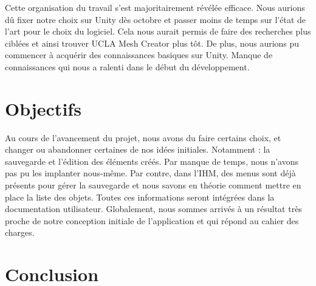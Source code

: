 \documentclass[a4paper,11pt]{article}
\begin{document}
				Cette organisation du travail s'est majoritairement révélée efficace. Nous aurions dû fixer notre choix sur Unity dès octobre et passer moins de temps sur l'état de l'art pour le choix du logiciel. Cela nous aurait permis de faire des recherches plus ciblées et ainsi trouver UCLA Mesh Creator plus tôt. De plus, nous aurions pu commencer à acquérir des connaissances basiques sur Unity. Manque de connaissances qui nous a ralenti dans le début du développement.
			
	
	\section{Objectifs}

		Au cours de l'avancement du projet, nous avons du faire certains choix, et changer ou abandonner certaines de nos idées initiales. Notamment : la sauvegarde et l'édition des éléments créés.
		Par manque de temps, nous n'avons pas pu les implanter nous-même. Par contre, dans l'IHM, des menus sont déjà présents pour gérer la sauvegarde et nous savons en théorie comment mettre en place la liste des objets. Toutes ces informations seront intégrées dans la documentation utilisateur.
		Globalement, nous sommes arrivés à un résultat très proche de notre conception initiale de l'application et qui répond au cahier des charges.
	
	\section{Conclusion}
			
\end{document}
